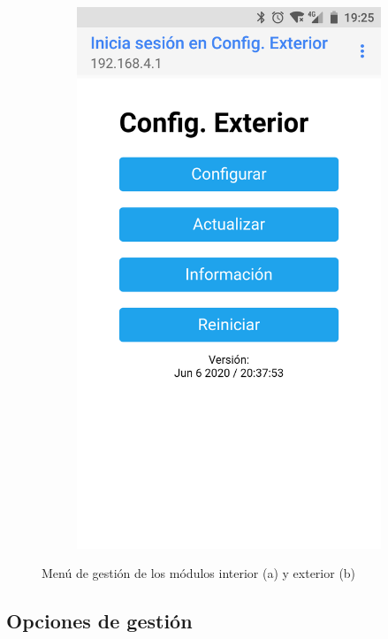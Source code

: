 \begin{figure}
\begin{subfigure}{0.49\columnwidth}
  \includegraphics[width=1\columnwidth,frame]{images/exterior-menu}
  \caption{}
  \label{fig:exterior-menu}
\end{subfigure}
\caption{Menú de gestión de los módulos interior (a) y exterior (b)}
\label{fig:menu}
\end{figure}

\subsection{Opciones de gestión}

